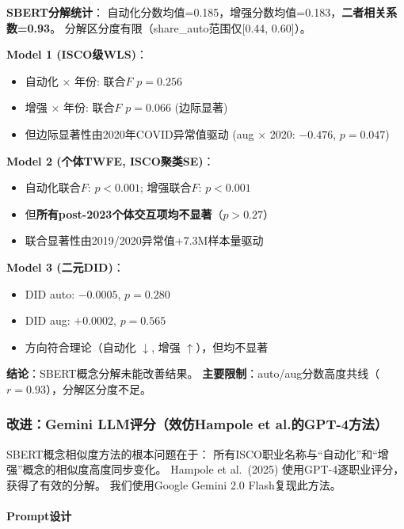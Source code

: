 \documentclass[12pt,a4paper]{ctexart}
\begin{document}
\begin{resultbox}[策略六结果]
\textbf{SBERT分解统计}：
自动化分数均值=0.185，增强分数均值=0.183，\textbf{二者相关系数=0.93}。
分解区分度有限（share\_auto范围仅[0.44, 0.60]）。

\textbf{Model 1 (ISCO级WLS)}：
\begin{itemize}
\item 自动化 $\times$ 年份: 联合$F$ $p=0.256$
\item 增强 $\times$ 年份: 联合$F$ $p=0.066$ (边际显著)
\item 但边际显著性由2020年COVID异常值驱动 (aug $\times$ 2020: $-0.476$, $p=0.047$)
\end{itemize}

\textbf{Model 2 (个体TWFE, ISCO聚类SE)}：
\begin{itemize}
\item 自动化联合$F$: $p<0.001$; 增强联合$F$: $p<0.001$
\item 但\textbf{所有post-2023个体交互项均不显著}（$p>0.27$）
\item 联合显著性由2019/2020异常值+7.3M样本量驱动
\end{itemize}

\textbf{Model 3 (二元DID)}：
\begin{itemize}
\item DID auto: $-0.0005$, $p=0.280$
\item DID aug: $+0.0002$, $p=0.565$
\item 方向符合理论（自动化 $\downarrow$, 增强 $\uparrow$），但均不显著
\end{itemize}

\textbf{结论}：SBERT概念分解未能改善结果。
\textbf{主要限制}：auto/aug分数高度共线（$r=0.93$），分解区分度不足。
\end{resultbox}

\subsubsection{改进：Gemini LLM评分（效仿Hampole et al.的GPT-4方法）}

SBERT概念相似度方法的根本问题在于：
所有ISCO职业名称与``自动化''和``增强''概念的相似度高度同步变化。
Hampole et al.\ (2025) 使用GPT-4逐职业评分，获得了有效的分解。
我们使用Google Gemini 2.0 Flash复现此方法。

\paragraph{Prompt设计}
\end{document}

